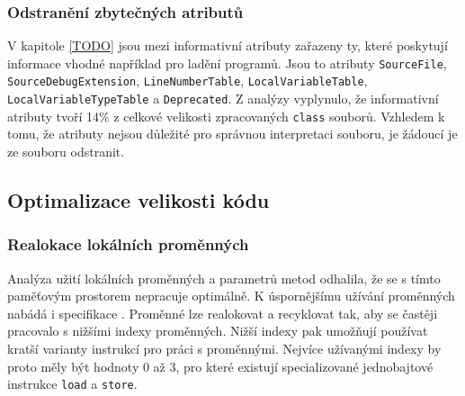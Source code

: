 \subsubsection{Odstranění zbytečných atributů}
V kapitole \ref{TODO} jsou mezi informativní atributy zařazeny ty, které poskytují informace vhodné například pro ladění programů. Jsou to atributy \texttt{SourceFile}, \texttt{SourceDebugExtension}, \texttt{LineNumberTable}, \texttt{LocalVariableTable}, \texttt{LocalVariableTypeTable} a \texttt{Deprecated}.  Z analýzy vyplynulo, že informativní atributy tvoří 14\% z celkové velikosti zpracovaných \texttt{class} souborů. Vzhledem k tomu, že atributy nejsou důležité pro správnou interpretaci souboru, je žádoucí je ze souboru odstranit.



\subsection{Optimalizace velikosti kódu}


\subsubsection{Realokace lokálních proměnných}
Analýza užití lokálních proměnných a parametrů metod odhalila, že se s tímto paměťovým prostorem nepracuje optimálně. K úspornějšímu užívání proměnných nabádá i specifikace \cite{Lindholm:JVM}. Proměnné lze realokovat a recyklovat tak, aby se častěji pracovalo s nižšími indexy proměnných. Nižší indexy pak umožňují používat kratší varianty instrukcí pro práci s proměnnými. Nejvíce užívanými indexy by proto měly být hodnoty 0 až 3, pro které existují specializované jednobajtové instrukce \texttt{load} a \texttt{store}. 

